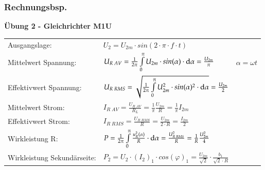 \subsubsection{Rechnungsbsp.}
\textbf{Übung 2 - Gleichrichter M1U}\newline
\renewcommand{\arraystretch}{2}
\begin{tabular}{ p{}  p{}  p{}}
    Ausgangslage:&
    $ U_2= U_{2m}\cdot sin(2\cdot \pi\cdot f\cdot t)$&
    \\
    Mittelwert Spannung: &
    $ U_{R \; AV}= \frac{1}{2 \pi} \int\limits_{0}^{\pi} U_{2m}\cdot sin(\alpha)\cdot\mathop{}\!\mathrm{d}\alpha=\frac{U_{2m}}{\pi} $ &
    $ \alpha=\omega t $
    \\
    
    Effektivwert Spannung:   &
    $ U_{R \; RMS}= \sqrt{\frac{1}{2 \pi}\int\limits_{0}^{\pi} U_{2m}^2\cdot sin(\alpha)^2\cdot\mathop{}\!\mathrm{d}\alpha} = \frac{U_{2m}}{2} $ &
    \\ 
    
    Mittelwert Strom: &
    $ I_{R \; AV}=\frac{U_{R \; AV}}{R_L}= \frac{1}{\pi}\frac{U_{2m}}{R}= \frac{1}{\pi} I_{2m} $ &
    \\
    
    Effektivwert Strom: &
    $ I_{R \; RMS}=\frac{U_{R \; RMS}}{R}= \frac{U_{2m}}{2\cdot R}= \frac{I_{2m}}{2} $ &
    \\
    
    Wirkleistung R: &
    $ P= \frac{1}{2\pi}\int\limits_{0}^{\pi}\frac{u_R^2(\alpha)}{R}\cdot \mathop{}\!\mathrm{d} \alpha = \frac{U_{R \; RMS}^2}{R}=\frac{1}{R}\frac{U_{2m}^2}{4} $&
    \\
    
    Wirkleistung Sekundärseite: &
    $P_2 = U_2 \cdot (I_2)_1 \cdot cos(\varphi)_1 = \frac{U_{2m}}{\sqrt{2}} \cdot \frac{b_1}{\sqrt{2} \cdot R}$&
    \\
\end{tabular}
\renewcommand{\arraystretch}{1}

\clearpage

